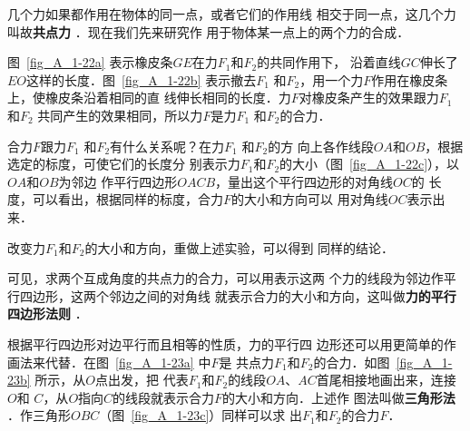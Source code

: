     几个力如果都作用在物体的同一点，或者它们的作用线
相交于同一点，这几个力叫故\textbf{共点力} ．现在我们先来研究作
用于物体某一点上的两个力的合成．

    图~\ref{fig_A_1-22a} 表示橡皮条$GE$在力$F_1$和$F_2$的共同作用下，
沿着直线$GC$伸长了$EO$这样的长度．图~\ref{fig_A_1-22b} 表示撤去$F_1$
和$F_2$，用一个力$F$作用在橡皮条上，使橡皮条沿着相同的直
线伸长相同的长度．力$F$对橡皮条产生的效果跟力$F_1$
和$F_2$
共同产生的效果相同，所以力$F$是力$F_1$
和$F_2$的合力．




    合力$F$跟力$F_1$
和$F_2$有什么关系呢？在力$F_1$
和$F_2$的方
向上各作线段$OA$和$OB$，根据选定的标度，可使它们的长度分
别表示力$F_1$和$F_2$的大小（图~\ref{fig_A_1-22c}），以$OA$和$OB$为邻边
作平行四边形$OACB$，量出这个平行四边形的对角线$OC$的
长度，可以看出，根据同样的标度，合力$F$的大小和方向可以
用对角线$OC$表示出来．

    改变力$F_1$和$F_2$的大小和方向，重做上述实验，可以得到
同样的结论．

    可见，求两个互成角度的共点力的合力，可以用表示这两
个力的线段为邻边作平行四边形，这两个邻边之间的对角线
就表示合力的大小和方向，这叫做\textbf{力的平行四边形法则} ．

    根据平行四边形对边平行而且相等的性质，力的平行四
边形还可以用更简单的作画法来代替．在图~\ref{fig_A_1-23a} 中$F$是
共点力$F_1$和$F_2$的合力．如图~\ref{fig_A_1-23b} 所示，从$O$点出发，把
代表$F_1$和$F_2$的线段$OA$、$AC$首尾相接地画出来，连接$O$和
$C$，从$O$指向$C$的线段就表示合力$F$的大小和方向．上述作
图法叫做\textbf{三角形法} ．作三角形$OBC$（图~\ref{fig_A_1-23c}）同样可以求
出$F_1$和$F_2$的合力$F$．

